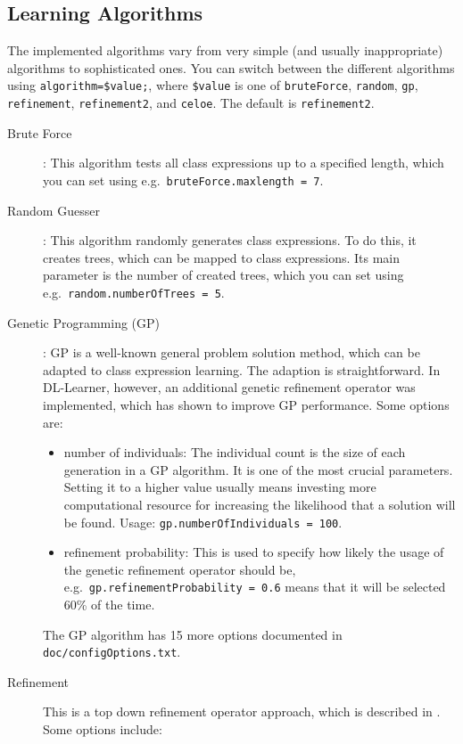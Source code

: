 \documentclass[a4paper,12pt]{scrartcl}
\begin{document}
\subsection{Learning Algorithms}

The implemented algorithms vary from very simple (and usually inappropriate) algorithms to sophisticated ones. You can switch between the different algorithms using \verb|algorithm=$value;|, where \verb|$value| is one of \verb|bruteForce|, \verb|random|, \verb|gp|, \verb|refinement|, \verb|refinement2|, and \verb|celoe|. The default is \verb|refinement2|.

\begin{description}
 \item[Brute Force]: This algorithm tests all class expressions up to a specified length, which you can set using e.g.~\verb|bruteForce.maxlength = 7|.
 \item[Random Guesser]: This algorithm randomly generates class expressions. To do this, it creates trees, which can be mapped to class expressions. Its main parameter is the number of created trees, which you can set using e.g.~\verb|random.numberOfTrees = 5|.
 \item[Genetic Programming (GP)]: GP is a well-known general problem solution method, which can be adapted to class expression learning. The adaption is straightforward. In DL-Learner, however, an additional genetic refinement operator was implemented, which has shown to improve GP performance\cite{hybrid_gp}. Some options are:
 \begin{itemize}
  \item number of individuals: The individual count is the size of each generation in a GP algorithm. It is one of the most crucial parameters. Setting it to a higher value usually means investing more computational resource for increasing the likelihood that a solution will be found. Usage: \verb|gp.numberOfIndividuals = 100|.
  \item refinement probability: This is used to specify how likely the usage of the genetic refinement operator should be, e.g.~\verb|gp.refinementProbability = 0.6| means that it will be selected 60\% of the time.
 \end{itemize}
 The GP algorithm has 15 more options documented in \verb|doc/configOptions.txt|.
 \item[Refinement] This is a top down refinement operator approach, which is described in \cite{alc_learning_algorithm}. Some options include:
 \begin{itemize}

\end{itemize}
\end{description}
\end{document}
